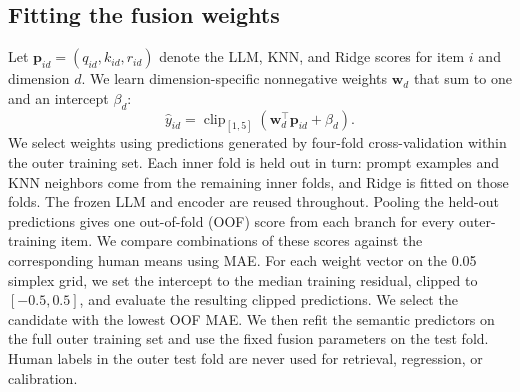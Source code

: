 \subsection{Fitting the fusion weights}

Let $\mathbf{p}_{id}=(q_{id},k_{id},r_{id})$ denote the LLM, KNN, and Ridge scores for item $i$ and dimension $d$. We learn dimension-specific nonnegative weights $\mathbf{w}_d$ that sum to one and an intercept $\beta_d$:
\begin{equation}
\hat{y}_{id}=\operatorname{clip}_{[1,5]}
\left(\mathbf{w}_d^\top\mathbf{p}_{id}+\beta_d\right).
\label{eq:fusion}
\end{equation}
We select weights using predictions generated by four-fold cross-validation within the outer training set. Each inner fold is held out in turn: prompt examples and KNN neighbors come from the remaining inner folds, and Ridge is fitted on those folds. The frozen LLM and encoder are reused throughout. Pooling the held-out predictions gives one out-of-fold (OOF) score from each branch for every outer-training item. We compare combinations of these scores against the corresponding human means using MAE. For each weight vector on the 0.05 simplex grid, we set the intercept to the median training residual, clipped to $[-0.5,0.5]$, and evaluate the resulting clipped predictions. We select the candidate with the lowest OOF MAE. We then refit the semantic predictors on the full outer training set and use the fixed fusion parameters on the test fold. Human labels in the outer test fold are never used for retrieval, regression, or calibration.
